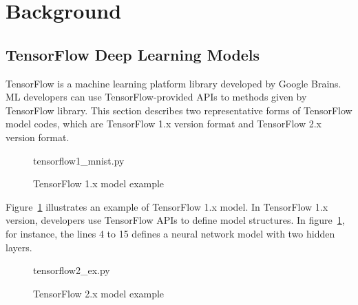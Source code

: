 \section{Background}\label{sec:background}
\subsection{TensorFlow Deep Learning Models}



TensorFlow\cite{tensorflow} is a machine learning platform library
developed by Google Brains.
ML developers can use TensorFlow-provided APIs to 
methods given by TensorFlow library.
This section describes two representative forms of TensorFlow
model codes, which are TensorFlow 1.x version format and 
TensorFlow 2.x version format.

\begin{figure}[ht!]

{tensorflow1_mnist.py}
  \caption{TensorFlow 1.x model example}
\label{fig:back:tf1}
\end{figure}

Figure~\ref{fig:back:tf1} illustrates an example of TensorFlow 1.x model.
In TensorFlow 1.x version, developers use TensorFlow APIs to define model
structures.
In figure~\ref{fig:back:tf1}, for instance, the lines 4 to 15
defines a neural network model with two hidden layers.
 
\begin{figure}[ht!]

{tensorflow2_ex.py}
  \caption{TensorFlow 2.x model example}
\label{fig:back:tf2}
\end{figure}


